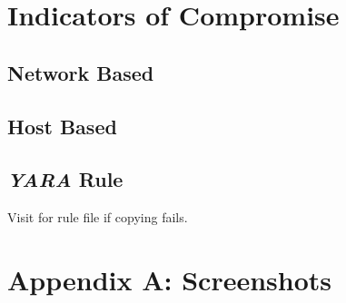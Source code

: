 \documentclass[10pt,a4paper]{article}
\begin{document}
\newpage

\section{Indicators of Compromise}
	\subsection{Network Based}
	\subsection{Host Based}
	\subsection{\textit{YARA} Rule}
		Visit \cite{ghub} for rule file if copying fails.
		

\newpage

\section{Appendix A: Screenshots}

\newpage

\printbibliography
\end{document}
